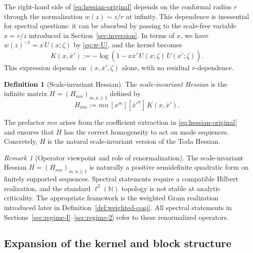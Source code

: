 \documentclass[11pt]{amsart}
\numberwithin{equation}{section}
\theoremstyle{plain}
\theoremstyle{definition}
\newtheorem{definition}[theorem]{Definition}
\theoremstyle{remark}
\newtheorem{remark}[theorem]{Remark}
\newcommand{\NN}{\mathbb{N}}
\begin{document}
The right-hand side of \eqref{eq:hessian-original} depends on the conformal
radius $r$ through the normalization $w(z) \sim z/r$ at infinity. This
dependence is inessential for spectral questions: it can be absorbed by
passing to the scale-free variable $x = r/z$ introduced in
Section~\ref{sec:inversion}. In terms of $x$, we have
$w(z)^{-1} = x \, U(x;\zeta)$ by \eqref{eq:w-U}, and the kernel becomes
\begin{equation}\label{eq:kernel-scaled}
	{K}(x, \bar{x}')
	:= -\log\!\left(1 - x\bar{x}' \, U(x;\zeta) \, \overline{U(x';\zeta)}\right).
\end{equation}
This expression depends on $(x, \bar{x}', \zeta)$ alone, with no residual
$r$-dependence.

\begin{definition}[Scale-invariant Hessian]
	\label{def:Hessian}
	The \emph{scale-invariant Hessian} is the infinite matrix $H = (H_{mn})_{m,n \ge 1}$
	defined by
	\begin{equation}\label{eq:H-def}
		H_{mn} := mn \, [x^{m}][\bar{x}'^{n}] \, {K}(x, \bar{x}').
	\end{equation}
\end{definition}

The prefactor $mn$ arises from the coefficient extraction in
\eqref{eq:hessian-original} and ensures that $H$ has the correct homogeneity
to act on mode sequences. Concretely, $H$ is the natural scale-invariant version of the Toda Hessian.
\begin{remark}[Operator viewpoint and role of renormalization]
	\label{rem:operator}
	The scale-invariant Hessian $H=(H_{mn})_{m,n\ge1}$ is naturally a positive
	semidefinite quadratic form on finitely supported sequences. Spectral
	statements require a compatible Hilbert realization, and the standard
	$\ell^2(\NN)$ topology is not stable at analytic criticality. The appropriate
	framework is the weighted Gram realization introduced later in
	Definition~\ref{def:weighted-conj}. All spectral statements in
	Sections~\ref{sec:regime-I}--\ref{sec:regime-2} refer to these renormalized
	operators.
\end{remark}

\subsection{Expansion of the kernel and block structure}
\label{subsec:kernel-expansion}
\end{document}

